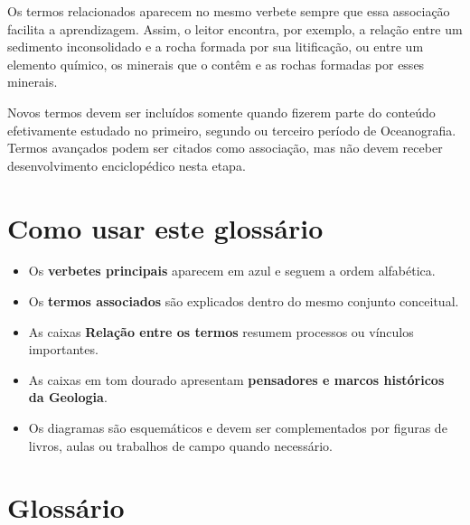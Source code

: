 \documentclass[11pt,a4paper,twoside,openany]{book}
\newcommand{\notaescopo}[1]{%
  \begin{tcolorbox}[
    colback=white,
    colframe=uerjred,
    title={Nota de escopo},
    fonttitle=\sffamily\bfseries,
    boxrule=0.55pt,
    arc=1mm
  ]
  #1
  \end{tcolorbox}
}
\begin{document}
Os termos relacionados aparecem no mesmo verbete sempre que essa associação facilita a aprendizagem. Assim, o leitor encontra, por exemplo, a relação entre um sedimento inconsolidado e a rocha formada por sua litificação, ou entre um elemento químico, os minerais que o contêm e as rochas formadas por esses minerais.

\notaescopo{Novos termos devem ser incluídos somente quando fizerem parte do conteúdo efetivamente estudado no primeiro, segundo ou terceiro período de Oceanografia. Termos avançados podem ser citados como associação, mas não devem receber desenvolvimento enciclopédico nesta etapa.}

\chapter*{Como usar este glossário}

\begin{itemize}
  \item Os \textbf{verbetes principais} aparecem em azul e seguem a ordem alfabética.
  \item Os \textbf{termos associados} são explicados dentro do mesmo conjunto conceitual.
  \item As caixas \textbf{Relação entre os termos} resumem processos ou vínculos importantes.
  \item As caixas em tom dourado apresentam \textbf{pensadores e marcos históricos da Geologia}.
  \item Os diagramas são esquemáticos e devem ser complementados por figuras de livros, aulas ou trabalhos de campo quando necessário.
\end{itemize}

\tableofcontents

\mainmatter
\chapter*{Glossário}
\end{document}
